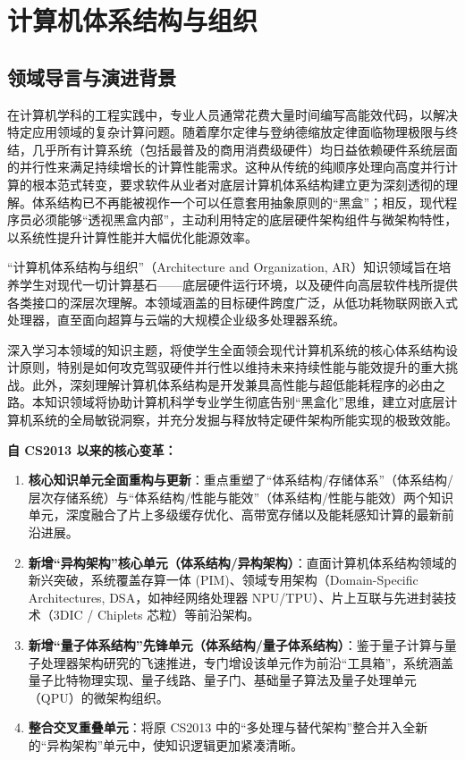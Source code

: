 \chapter{计算机体系结构与组织}

\section{领域导言与演进背景}

\begin{preamblebox}[知识领域概述与变革]
在计算机学科的工程实践中，专业人员通常花费大量时间编写高能效代码，以解决特定应用领域的复杂计算问题。随着摩尔定律与登纳德缩放定律面临物理极限与终结，几乎所有计算系统（包括最普及的商用消费级硬件）均日益依赖硬件系统层面的并行性来满足持续增长的计算性能需求。这种从传统的纯顺序处理向高度并行计算的根本范式转变，要求软件从业者对底层计算机体系结构建立更为深刻透彻的理解。体系结构已不再能被视作一个可以任意套用抽象原则的“黑盒”；相反，现代程序员必须能够“透视黑盒内部”，主动利用特定的底层硬件架构组件与微架构特性，以系统性提升计算性能并大幅优化能源效率。

“计算机体系结构与组织”（Architecture and Organization, AR）知识领域旨在培养学生对现代一切计算基石——底层硬件运行环境，以及硬件向高层软件栈所提供各类接口的深层次理解。本领域涵盖的目标硬件跨度广泛，从低功耗物联网嵌入式处理器，直至面向超算与云端的大规模企业级多处理器系统。

深入学习本领域的知识主题，将使学生全面领会现代计算机系统的核心体系结构设计原则，特别是如何攻克驾驭硬件并行性以维持未来持续性能与能效提升的重大挑战。此外，深刻理解计算机体系结构是开发兼具高性能与超低能耗程序的必由之路。本知识领域将协助计算机科学专业学生彻底告别“黑盒化”思维，建立对底层计算机系统的全局敏锐洞察，并充分发掘与释放特定硬件架构所能实现的极致效能。

\textbf{自 CS2013 以来的核心变革：}
\begin{enumerate}
    \item \textbf{核心知识单元全面重构与更新}：重点重塑了“体系结构/存储体系”（体系结构/层次存储系统）与“体系结构/性能与能效”（体系结构/性能与能效）两个知识单元，深度融合了片上多级缓存优化、高带宽存储以及能耗感知计算的最新前沿进展。
    \item \textbf{新增“异构架构”核心单元（体系结构/异构架构）}：直面计算机体系结构领域的新兴突破，系统覆盖存算一体 (PIM)、领域专用架构（Domain-Specific Architectures, DSA，如神经网络处理器 NPU/TPU）、片上互联与先进封装技术（3DIC / Chiplets 芯粒）等前沿架构。
    \item \textbf{新增“量子体系结构”先锋单元（体系结构/量子体系结构）}：鉴于量子计算与量子处理器架构研究的飞速推进，专门增设该单元作为前沿“工具箱”，系统涵盖量子比特物理实现、量子线路、量子门、基础量子算法及量子处理单元（QPU）的微架构组织。
    \item \textbf{整合交叉重叠单元}：将原 CS2013 中的“多处理与替代架构”整合并入全新的“异构架构”单元中，使知识逻辑更加紧凑清晰。
\end{enumerate}
\end{preamblebox}

